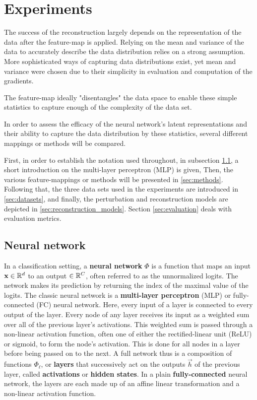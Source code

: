 
\chapter{Experiments}
\label{chap:Experiments} 

The success of the reconstruction largely depends on the representation of the data
after the feature-map is applied.
Relying on the mean and variance of the data to accurately describe the data distribution 
relies on a strong assumption.
More sophisticated ways of capturing data distributions exist, yet mean and variance were chosen due to their simplicity in evaluation and computation of the gradients.

The feature-map ideally "disentangles" the data space to enable 
these simple statistics to capture enough of the complexity of the data set.

In order to assess the efficacy of the neural network's latent representations 
and their ability to capture the data distribution by these statistics,
several different mappings or methods will be compared. 

First, in order to establish the notation used throughout, in subsection \ref{sec:nn_def}, 
a short introduction on the multi-layer perceptron (MLP) is given,
Then, the various feature-mappings or methods will be presented in \ref{sec:methods}.
Following that, the three data sets used in the experiments are introduced in \ref{sec:datasets},
and finally, the perturbation and reconstruction models are depicted in \ref{sec:reconstruction_models}.
Section \ref{sec:evaluation} deals with evaluation metrics.

\section{Neural network}
\label{sec:nn_def}

In a classification setting, a \textbf{neural network} $\Phi$ is a function that maps an input $\mathbf x \in \mathbb{R}^d$ to an output $\in \mathbb{R}^C$,
often referred to as the unnormalized logits. 
The network makes its prediction by returning the index of the maximal value of the logits.
The classic neural network is a \textbf{multi-layer perceptron} (MLP) or fully-connected (FC) neural network.
Here, every input of a layer is connected to every output of the layer.
Every node of any layer receives its input as a weighted sum over all of the previous layer's activations.
This weighted sum is passed through a non-linear activation function, often one of either the rectified-linear unit (ReLU) or sigmoid, to form the node's activation. 
This is done for all nodes in a layer before being passed on to the next.
A full network thus is a composition of functions $\Phi_\ell$, or \textbf{layers} that 
successively act on the outputs $\vec h$ of the previous layer, called \textbf{activations} or \textbf{hidden states}. 
In a plain \textbf{fully-connected} neural network, the layers are each made up of an affine linear transformation and a non-linear activation function.

